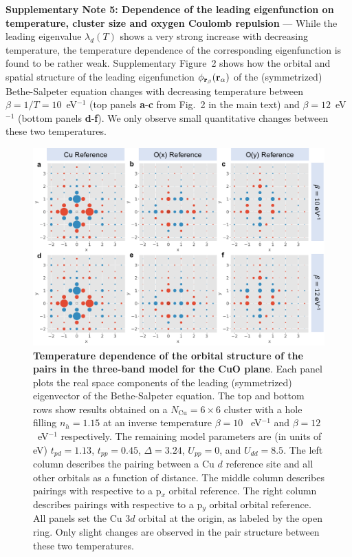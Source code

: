 \documentclass[11pt,superscriptaddress,floatfix,notitlepage]{revtex4-1}
\begin{document}
\newpage\noindent\textbf{Supplementary Note 5: Dependence of the leading eigenfunction on temperature, cluster size and oxygen Coulomb repulsion} --- 
While the leading eigenvalue $\lambda_d(T)$ shows a very strong increase with decreasing temperature, the temperature dependence of the corresponding eigenfunction is found to be rather weak. Supplementary Figure~2 shows how the orbital and spatial structure of the leading eigenfunction $\phi_{{\bf r}_\beta}({\bf r}_\alpha)$ of the (symmetrized) Bethe-Salpeter equation changes with decreasing temperature between $\beta=1/T=10$~eV$^{-1}$ (top panels {\bf a}-{\bf c} from Fig.~2 in the main text) and $\beta=12$~eV$^{-1}$ (bottom panels {\bf d}-{\bf f}). We only observe small quantitative changes between these two temperatures. 

\begin{figure}[h]
\centering
\includegraphics[width=\linewidth]{./Figures/DCAeigenvector6by6varyT.pdf}
\caption{{\bf Temperature dependence of the orbital structure of the pairs in the 
three-band model for the CuO plane}. Each panel plots the real space components of the leading (symmetrized) eigenvector of the Bethe-Salpeter equation. The top and bottom rows show results obtained on a $N_\text{Cu}=6\times6$ cluster with a hole filling $n_h=1.15$ at an inverse temperature $\beta=10$ ~eV$^{-1}$ and $\beta=12$ ~eV$^{-1}$ respectively. The remaining model parameters are (in units of eV) $t_{pd}=1.13$, $t_{pp}=0.45$, $\Delta=3.24$, $U_{pp} = 0$, and $U_{dd}=8.5$. The left column describes the pairing between a Cu $d$ reference site and all other orbitals as a function of distance. The middle column describes pairings with respective to a p$_x$ orbital reference. The right column describes pairings with respective to a p$_y$ orbital orbital reference. All panels set the Cu $3d$ orbital at the origin, as labeled by the open ring. Only slight changes are observed in the pair structure between these two temperatures.}
\label{Fig:DCAeigenvector6by6varyT}
\end{figure}
\end{document}
